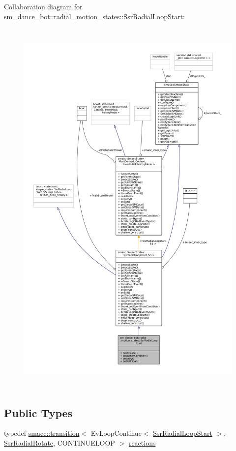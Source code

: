 Collaboration diagram for sm\+\_\+dance\+\_\+bot\+:\+:radial\+\_\+motion\+\_\+states\+:\+:Ssr\+Radial\+Loop\+Start\+:
\nopagebreak
\begin{figure}[H]
\begin{center}
\leavevmode
\includegraphics[height=550pt]{structsm__dance__bot_1_1radial__motion__states_1_1SsrRadialLoopStart__coll__graph}
\end{center}
\end{figure}
\subsection*{Public Types}
\begin{DoxyCompactItemize}
\item 
typedef \hyperlink{classsmacc_1_1transition}{smacc\+::transition}$<$ Ev\+Loop\+Continue$<$ \hyperlink{structsm__dance__bot_1_1radial__motion__states_1_1SsrRadialLoopStart}{Ssr\+Radial\+Loop\+Start} $>$, \hyperlink{structsm__dance__bot_1_1radial__motion__states_1_1SsrRadialRotate}{Ssr\+Radial\+Rotate}, C\+O\+N\+T\+I\+N\+U\+E\+L\+O\+OP $>$ \hyperlink{structsm__dance__bot_1_1radial__motion__states_1_1SsrRadialLoopStart_a0391d150ac5c4b76ee3c77583cc96318}{reactions}
\end{DoxyCompactItemize}

